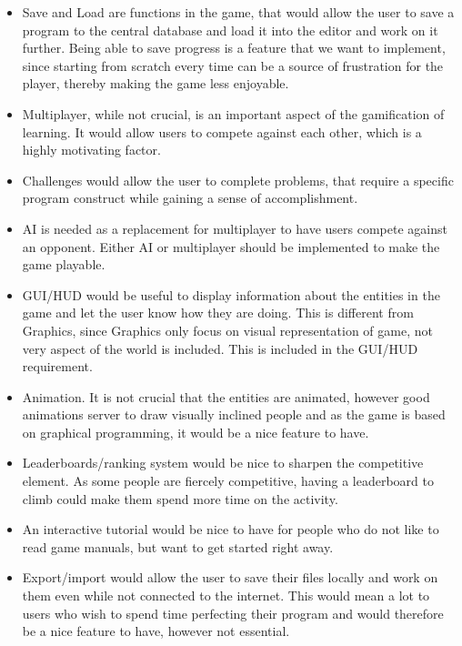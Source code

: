 \begin{itemize}
\item Save and Load are functions in the game, that would allow the user to save a program to the central database and load it into the editor and work 
on it further. Being able to save progress is a feature that we want to implement, since starting from scratch every time can be a source of 
frustration for the player, thereby making the game less enjoyable.

\item Multiplayer, while not crucial, is an important aspect of the gamification of learning. It would allow users to compete against each other, which 
is a highly motivating factor.

\item Challenges would allow the user to complete problems, that require a specific program construct while gaining a sense of accomplishment.

\item AI is needed as a replacement for multiplayer to have users compete against an opponent. Either AI or multiplayer should be implemented to make 
the game playable.

\item GUI/HUD would be useful to display information about the entities in the game and let the user know how they are doing. This is different from 
Graphics, since Graphics only focus on visual representation of game, not very aspect of the world is included. This is included in the GUI/HUD 
requirement.
\end{itemize}

\begin{itemize}
\item Animation. It is not crucial that the entities are animated, however good animations server to draw visually inclined people and as the game is 
based on graphical programming, it would be a nice feature to have.

\item Leaderboards/ranking system would be nice to sharpen the competitive element. As some people are fiercely competitive, having a leaderboard to 
climb could make them spend more time on the activity.

\item An interactive tutorial would be nice to have for people who do not like to read game manuals, but want to get started right away.

\item Export/import would allow the user to save their files locally and work on them even while not connected to the internet. This would mean a lot 
to users who wish to spend time perfecting their program and would therefore be a nice feature to have, however not essential.
\end{itemize}